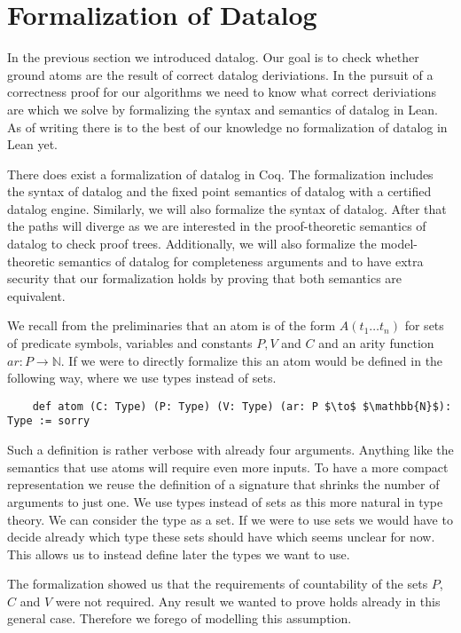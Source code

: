 \section{Formalization of Datalog}
In the previous section we introduced datalog. Our goal is to check whether ground atoms are the result of correct datalog deriviations. In the pursuit of a correctness proof for our algorithms we need to know what correct deriviations are which we solve by formalizing the syntax and semantics of datalog in Lean. As of writing there is to the best of our knowledge no formalization of datalog in Lean yet. 

There does exist a formalization of datalog in Coq\cite{datalogCoq}. The formalization includes the syntax of datalog and the fixed point semantics of datalog with a certified datalog engine. Similarly, we will also formalize the syntax of datalog. After that the paths will diverge as we are interested in the proof-theoretic semantics of datalog to check proof trees. Additionally, we will also formalize the model-theoretic semantics of datalog for completeness arguments and to have extra security that our formalization holds by proving that both semantics are equivalent.

We recall from the preliminaries that an atom is of the form $A(t_1 \dots t_n)$ for sets of predicate symbols, variables and constants $P,V$ and $C$ and an arity function $ar: P \to \mathbb{N}$. If we were to directly formalize this an atom would be defined in the following way, where we use types instead of sets.

\begin{lstlisting}
    def atom (C: Type) (P: Type) (V: Type) (ar: P $\to$ $\mathbb{N}$): Type := sorry
\end{lstlisting}

Such a definition is rather verbose with already four arguments. Anything like the semantics that use atoms will require even more inputs. To have a more compact representation we reuse the definition of a signature that shrinks the number of arguments to just one.  We use types instead of sets as this more natural in type theory. We can consider the type as a set. If we were to use sets we would have to decide already which type these sets should have which seems unclear for now. This allows us to instead define later the types we want to use. 

The formalization showed us that the requirements of countability of the sets $P$, $C$ and $V$ were not required. Any result we wanted to prove holds already in this general case. Therefore we forego of modelling this assumption.

